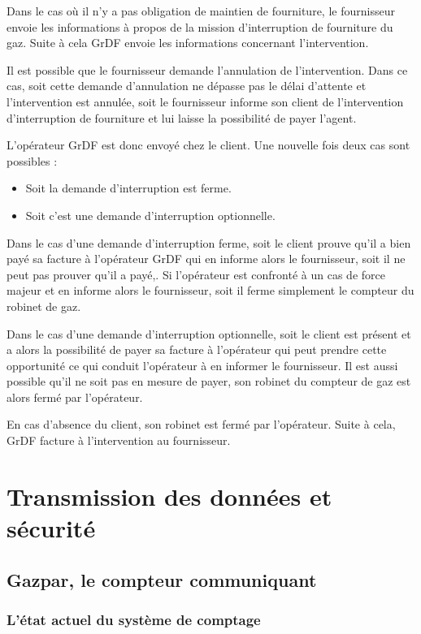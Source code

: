 \documentclass[
12pt,
french,                           %
a4paper,
]{article}
\begin{document}
Dans le cas où il n'y a pas obligation de maintien de fourniture, le
fournisseur envoie les informations à propos de la mission
d'interruption de fourniture du gaz. Suite à cela GrDF envoie les
informations concernant l'intervention.

Il est possible que le fournisseur demande l'annulation de
l'intervention. Dans ce cas, soit cette demande d'annulation ne dépasse
pas le délai d'attente et l'intervention est annulée, soit le
fournisseur informe son client de l'intervention d'interruption de
fourniture et lui laisse la possibilité de payer l'agent.

L'opérateur GrDF est donc envoyé chez le client. Une nouvelle fois deux
cas sont possibles :

\begin{itemize}
\item
  Soit la demande d'interruption est ferme.
\item
  Soit c'est une demande d'interruption optionnelle.
\end{itemize}

Dans le cas d'une demande d'interruption ferme, soit le client prouve
qu'il a bien payé sa facture à l'opérateur GrDF qui en informe alors le
fournisseur, soit il ne peut pas prouver qu'il a payé,. Si l'opérateur
est confronté à un cas de force majeur et en informe alors le
fournisseur, soit il ferme simplement le compteur du robinet de gaz.

Dans le cas d'une demande d'interruption optionnelle, soit le client est
présent et a alors la possibilité de payer sa facture à l'opérateur qui
peut prendre cette opportunité ce qui conduit l'opérateur à en informer
le fournisseur. Il est aussi possible qu'il ne soit pas en mesure de
payer, son robinet du compteur de gaz est alors fermé par l'opérateur.

En cas d'absence du client, son robinet est fermé par l'opérateur. Suite
à cela, GrDF facture à l'intervention au fournisseur.

\section{Transmission des données et sécurité}

\subsection{Gazpar, le compteur communiquant}

\subsubsection{L'état actuel du système de comptage}
\end{document}
